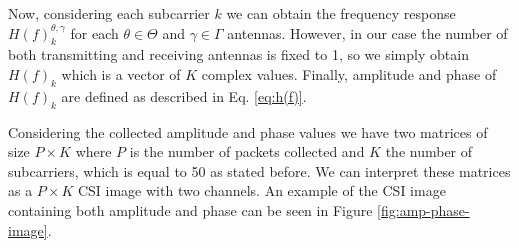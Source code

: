 \documentclass[binding=0.6cm,noexaminfo]{sapthesis}
\begin{document}
Now, considering each subcarrier $k$ we can obtain the frequency response $H(f)_k^{\theta, \gamma}$ for each $\theta \in \Theta$ and $\gamma \in \Gamma$ antennas. However, in our case the number of both transmitting and receiving antennas is fixed to 1, so we simply obtain $H(f)_k$ which is a vector of $K$ complex values. Finally, amplitude and phase of $H(f)_k$ are defined as described in Eq. \ref{eq:h(f)}.

Considering the collected amplitude and phase values we have two matrices of size $P \times K$ where $P$ is the number of packets collected and $K$ the number of subcarriers, which is equal to 50 as stated before. We can interpret these matrices as a $P \times K$ CSI image with two channels. An example of the CSI image containing both amplitude and phase can be seen in Figure \ref{fig:amp-phase-image}.
\end{document}
